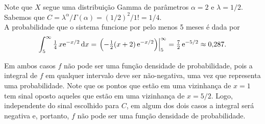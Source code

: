 \begin{questions}
\begin{solution}
	Note que $X$ segue uma distribuição Gamma de parâmetros $\alpha = 2$ e $\lambda = 1/2$. Sabemos que $C = \lambda^\alpha/\Gamma(\alpha) = (1/2)^2/1! = 1/4$.\\    
    A probabilidade que o sistema funcione por pelo menos 5 meses é dada por
    \begin{align*}
    	\int_5^\infty \tfrac{1}{4}\,x\mathrm{e}^{-x/2}\,\mathrm{d} x
        = \left.\left(-\tfrac{1}{2}(x+2)\,\mathrm{e}^{-x/2}\right)\right\rvert_5^\infty
        = \tfrac{7}{2}\,\mathrm{e}^{-5/2}
        \approx \text{0,287}.
    \end{align*}
\end{solution}

\begin{solution}
	Em ambos casos $f$ não pode ser uma função densidade de probabilidade, pois a integral de $f$ em qualquer intervalo deve ser não-negativa, uma vez que representa uma probabilidade. Note que os pontos que estão em uma vizinhança de $x=1$ tem sinal oposto aqueles que estão em uma vizinhança de $x=5/2$. Logo, independente do sinal escolhido para $C$, em algum dos dois casos a integral será negativa e, portanto, $f$ não pode ser uma função densidade de probabilidade.
\end{solution}


\end{questions}
